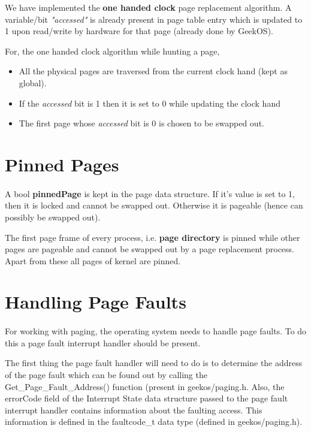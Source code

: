 \documentclass[11pt]{article}
\begin{document}
We have implemented the \textbf{one handed clock} page replacement algorithm. A variable/bit \textit{"accessed"} is already present in page table entry which is updated to 1 upon read/write by hardware for that page (already done by GeekOS). 

For, the one handed clock algorithm while hunting a page,
\begin{itemize}
\item  All the physical pages are traversed from the current clock hand (kept as global).
\item If the \textit{accessed} bit is 1 then it is set to 0 while updating the clock hand
\item The first page whose \textit{accessed} bit is 0 is chosen to be swapped out.
\end{itemize}






\section{Pinned Pages}
\paragraph{}
A bool \textbf{pinnedPage} is kept in the page data structure. If it's value is set to 1, then it is locked and cannot be swapped out. Otherwise it is pageable (hence can possibly be swapped out).

The first page frame of every process, i.e. \textbf{page directory} is pinned while other pages are pageable and cannot be swapped out by a page replacement process. Apart from these all pages of kernel are pinned.



\section{Handling Page Faults}
\paragraph{}


For working with paging, the operating system needs to handle page faults. To do this a page fault interrupt handler should be present.

The first thing the page fault handler will need to do is to determine the address of the page fault which can be found out  by calling the Get\_Page\_Fault\_Address() function (present in  geekos/paging.h. Also, the errorCode field of the Interrupt
State data structure passed to the page fault interrupt handler contains information about the faulting
access. This information is defined in the faultcode\_t data type (defined in geekos/paging.h).
\end{document}
